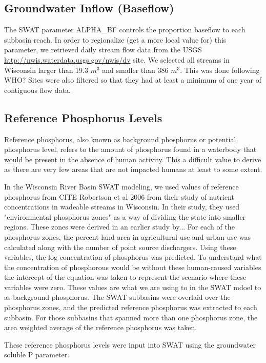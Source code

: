 \subsection{Groundwater Inflow (Baseflow)}
	The SWAT parameter ALPHA_BF controls the proportion baseflow to each subbasin reach. In order to regionalize (get a more local value for) this parameter, we retrieved daily stream flow data from the USGS \href{NWIS}{http://nwis.waterdata.usgs.gov/nwis/dv} site. We selected all streams in Wisconsin larger than 19.3 $m^3$ and smaller than 386 $m^3$. This was done following WHO? Sites were also filtered so that they had at least a minimum of one year of contiguous flow data. 

\subsection{Reference Phosphorus Levels}
	Reference phosphorus, also known as background phosphorus or potential phosphorus level, refers to the amount of phosphorus found in a waterbody that would be present in the absence of human activity. This a difficult value to derive as there are very few areas that are not impacted humans at least to some extent. 
	
	In the Wisconsin River Basin SWAT modeling, we used values of reference phosphorus from CITE Robertson et al 2006 from their study of nutrient concentrations in wadeable streams in Wisconsin. In their study, they used "environmental phosphorus zones" as a way of dividing the state into smaller regions. These zones were derived in an earlier study by...
	For each of the phosphorus zones, the percent land area in agricultural use and urban use was calculated along with the number of point source dischargers. Using these variables, the log concentration of phosphorus was predicted. To understand what the concentration of phosphorous would be without these human-caused variables the intercept of the equation was taken to represent the scenario where these variables were zero. These values are what we are using to in the SWAT mdoel to as background phosphorus. The SWAT subbasins were overlaid over the phosphorus zones, and the predicted reference phosphorus was extracted to each subbasin. For those subbasins that spanned more than one phosphorus zone, the area weighted average of the reference phosphorus was taken.
	
	These reference phosphorus levels were input into SWAT using the groundwater soluble P parameter.